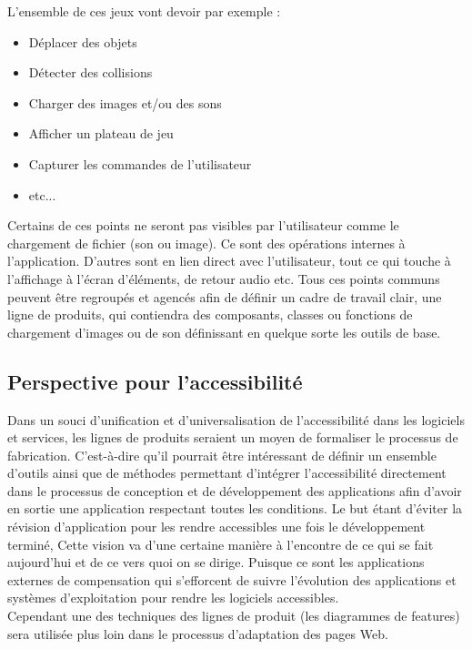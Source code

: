 \documentclass[french,a4paper]{report}
\begin{document}
{L'ensemble de ces jeux vont devoir par exemple :
\begin{itemize}\setlength{\itemsep}{0.4\baselineskip}
\item Déplacer des objets
\item Détecter des collisions
\item Charger des images et/ou des sons
\item Afficher un plateau de jeu
\item Capturer les commandes de l'utilisateur
\item etc...
\end{itemize}
Certains de ces points ne seront pas visibles par l'utilisateur comme le chargement de fichier (son ou image). Ce sont des opérations internes à l'application. D'autres sont en lien direct avec l'utilisateur, tout ce qui touche à l'affichage à l'écran d'éléments, de retour audio etc.
\newline
Tous ces points communs peuvent être regroupés et agencés afin de définir un
cadre de travail clair, une ligne de produits, qui contiendra des composants,
classes ou fonctions de chargement d'images ou de son définissant en quelque
sorte les outils de base.
\subsection{Perspective pour l'accessibilité}
Dans un souci d'unification et d'universalisation de l'accessibilité dans les logiciels et services, les lignes de produits seraient un moyen de formaliser le processus de fabrication.
C'est-à-dire qu'il pourrait être intéressant de définir un ensemble d'outils ainsi que de méthodes permettant d'intégrer l'accessibilité directement dans le processus de conception et de développement des applications afin d'avoir en sortie une application respectant toutes les conditions. Le but étant d'éviter la révision d'application pour les rendre accessibles une fois le développement terminé,
\newline
Cette vision va d'une certaine manière à l'encontre de ce qui se fait aujourd'hui et de ce vers
quoi on se dirige. Puisque ce sont les applications externes de compensation qui s'efforcent de
suivre l'évolution des applications et systèmes d'exploitation pour rendre les logiciels
accessibles. \\
Cependant une des techniques des lignes de produit (les diagrammes de features) sera utilisée
plus loin dans le processus d'adaptation des pages Web.
}
\end{document}
